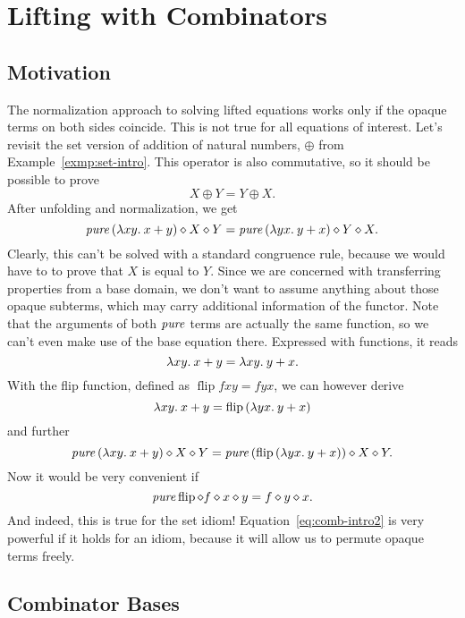 \section{Lifting with Combinators}\label{sec:combinators}

\subsection{Motivation}\label{subsec:combinator-motivation}

The normalization approach to solving lifted equations works only if the
opaque terms on both sides coincide.
This is not true for all equations of interest.
Let's revisit the set version of addition of natural numbers, $\oplus$ from
Example~\ref{exmp:set-intro}.
This operator is also commutative, so it should be possible to prove
\[ X \oplus Y = Y \oplus X. \]
After unfolding and normalization, we get
\begin{equation}\label{eq:comb-intro1}
	\operatorname{\mathit{pure}}{(\lambda xy.\>x + y)} \diamond X \diamond Y = \operatorname{\mathit{pure}}{(\lambda yx.\>y + x)} \diamond Y \diamond X.
\end{equation}
Clearly, this can't be solved with a standard congruence rule, because we would
have to to prove that $X$ is equal to $Y$.
Since we are concerned with transferring properties from a base domain,
we don't want to assume anything about those opaque subterms, which may
carry additional information of the functor.
Note that the arguments of both $\operatorname{\mathit{pure}}$ terms are actually the same function,
so we can't even make use of the base equation there.
Expressed with functions, it reads
\[ \lambda xy.\>x + y = \lambda xy.\>y + x. \]
With the flip function, defined as $\operatorname{flip} fxy = fyx$,
we can however derive
\[ \lambda xy.\>x + y = \operatorname{flip}{(\lambda yx.\>y + x)} \]
and further
\[ \operatorname{\mathit{pure}}{(\lambda xy.\>x + y)} \diamond X \diamond Y =
	\operatorname{\mathit{pure}}{(\operatorname{flip}{(\lambda yx.\>y + x)})} \diamond X \diamond Y. \]
Now it would be very convenient if
\begin{equation}\label{eq:comb-intro2}
	\operatorname{\mathit{pure}} \operatorname{flip} \diamond f \diamond x \diamond y = f \diamond y \diamond x.
\end{equation}
And indeed, this is true for the set idiom!
Equation~\eqref{eq:comb-intro2} is very powerful if it holds for an idiom,
because it will allow us to permute opaque terms freely.

\todo

\subsection{Combinator Bases}\label{subsec:combinator-bases}

